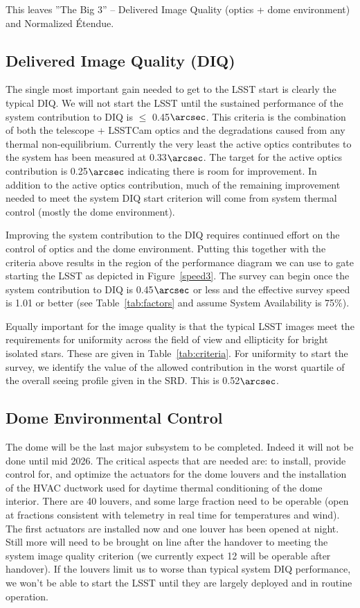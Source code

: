 This leaves ''The Big 3'' -- Delivered Image Quality (optics + dome environment) and Normalized \'{E}tendue.

\subsection{Delivered Image Quality (DIQ)}

The single most important gain needed to get to the LSST start is clearly the typical DIQ.  We will not start the LSST until the sustained performance of the system contribution to DIQ is $\le$ 0.45$\arcsec$.  This criteria is the combination of both the telescope + LSSTCam optics and the degradations caused from any thermal non-equilibrium. Currently the very least the active optics contributes to the system has been measured at 0.33$\arcsec$.  The target for the active optics contribution is 0.25$\arcsec$ indicating there is room for improvement.  In addition to the active optics contribution, much of the remaining improvement needed to meet the system DIQ start criterion will come from system thermal control (mostly the dome environment).

Improving the system contribution to the DIQ requires continued effort on the control of optics and the dome environment. Putting this together with the criteria above results in the region of the performance diagram we can use to gate starting the LSST as depicted in Figure~\ref{speed3}. The survey can begin once the system contribution to DIQ is 0.45$\arcsec$ or less and the effective survey speed is 1.01 or better (see Table~\ref{tab:factors} and assume System Availability is 75$\%$).

Equally important for the image quality is that the typical LSST images meet the requirements for uniformity across the field of view and ellipticity for bright isolated stars. These are given in Table~\ref{tab:criteria}. For uniformity to start the survey, we identify the value of the allowed contribution in the worst quartile of the overall seeing profile given in the SRD. This is 0.52$\arcsec$. 

\subsection{Dome Environmental Control}
The dome will be the last major subsystem to be completed. Indeed it will not be done until mid 2026. The critical aspects that are needed are: to install, provide control for, and optimize the actuators for the dome louvers and the installation of the HVAC ductwork used for daytime thermal conditioning of the dome interior. There are 40 louvers, and some large fraction need to be operable (open at fractions consistent with telemetry in real time for temperatures and wind). The first actuators are installed now and one louver has been opened at night. Still more will need to be brought on line after the handover to meeting the system image quality criterion (we currently expect 12 will be operable after handover). If the louvers limit us to worse than typical system DIQ performance, we won't be able to start the LSST until they are largely deployed and in routine operation. 

